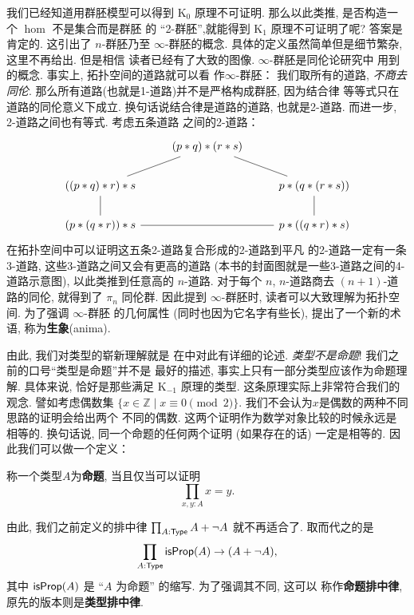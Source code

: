 我们已经知道用群胚模型可以得到 K\(_0\) 原理不可证明.
那么以此类推, 是否构造一个 \(\hom\) 不是集合而是群胚
的 “2-群胚”,就能得到 K\(_1\) 原理不可证明了呢? 答案是
肯定的. 这引出了 \(n\)-群胚乃至 \(\infty\)-群胚的概念.
具体的定义虽然简单但是细节繁杂, 这里不再给出. 但是相信
读者已经有了大致的图像. \(\infty\)-群胚是同伦论研究中
用到的概念. 事实上, 拓扑空间的道路就可以看
作\(\infty\)-群胚： 我们取所有的道路, \emph{不商去同伦}.
那么所有道路(也就是1-道路)并不是严格构成群胚, 因为结合律
等等式只在道路的同伦意义下成立. 换句话说结合律是道路的道路,
也就是2-道路. 而进一步, 2-道路之间也有等式. 考虑五条道路
之间的2-道路：
\[\begin{tikzcd}
& {(p * q) * (r * s)} \\
{((p * q) * r) * s} && {p * (q * (r * s))} \\
{(p * (q * r)) * s} && {p * ((q * r) * s)}
\arrow[no head, from=2-1, to=1-2]
\arrow[no head, from=2-1, to=3-1]
\arrow[no head, from=3-1, to=3-3]
\arrow[no head, from=3-3, to=2-3]
\arrow[no head, from=2-3, to=1-2]
\end{tikzcd}\]
在拓扑空间中可以证明这五条2-道路复合形成的2-道路到平凡
的2-道路一定有一条3-道路, 这些3-道路之间又会有更高的道路
(本书的封面图就是一些3-道路之间的4-道路示意图),
以此类推到任意高的 \(n\)-道路.
对于每个 \(n\), \(n\)-道路商去 \((n+1)\)-道路的同伦,
就得到了 \(\pi_n\) 同伦群. 因此提到 \(\infty\)-群胚时,
读者可以大致理解为拓扑空间. 为了强调 \(\infty\)-群胚
的几何属性 (同时也因为它名字有些长), 提出了一个新的术语,
称为\textbf{生象}(anima).

由此, 我们对类型的崭新理解就是
在\cite{ufp:2013:hottbook}中对此有详细的论述.
\emph{类型不是命题}! 我们之前的口号“类型是命题”并不是
最好的描述, 事实上只有一部分类型应该作为命题理解.
具体来说, 恰好是那些满足 K\(_{-1}\) 原理的类型.
这条原理实际上非常符合我们的观念.
譬如考虑偶数集 \(\{x \in \mathbb Z \mid x \equiv 0 \pmod 2\}\).
我们不会认为\(x\)是偶数的两种不同思路的证明会给出两个
不同的偶数. 这两个证明作为数学对象比较的时候永远是
相等的. 换句话说, 同一个命题的任何两个证明 (如果存在的话)
一定是相等的. 因此我们可以做一个定义：
\begin{definition}
称一个类型\(A\)为\textbf{命题}, 当且仅当可以证明
\[\prod_{x,y:A} x = y.\]
\end{definition}
由此, 我们之前定义的排中律
\(\prod_{A : \textnormal{\textsf{Type}}} A + \neg A\)
就不再适合了. 取而代之的是
\[\prod_{A : \textnormal{\textsf{Type}}} \textnormal{\textsf{isProp}}(A) \to
(A + \neg A),\] 其中 \(\textnormal{\textsf{isProp}}(A)\)
是 “\(A\) 为命题” 的缩写. 为了强调其不同, 这可以
称作\textbf{命题排中律}, 原先的版本则是\textbf{类型排中律}.

